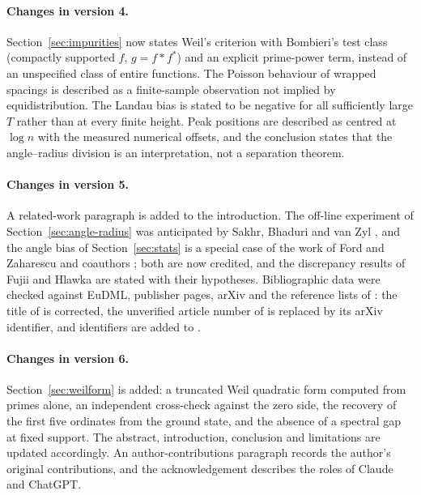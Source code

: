 \documentclass[11pt,a4paper]{article}
\theoremstyle{definition}\newtheorem{definition}[proposition]{Definition}
\theoremstyle{remark}\newtheorem{remark}[proposition]{Remark}
\begin{document}
\paragraph{Changes in version 4.} Section~\ref{sec:impurities} now states Weil's criterion with Bombieri's test class (compactly supported $f$, $g=f*f^*$) and an explicit prime-power term, instead of an unspecified class of entire functions. The Poisson behaviour of wrapped spacings is described as a finite-sample observation not implied by equidistribution. The Landau bias is stated to be negative for all sufficiently large $T$ rather than at every finite height. Peak positions are described as centred at $\log n$ with the measured numerical offsets, and the conclusion states that the angle--radius division is an interpretation, not a separation theorem.

\paragraph{Changes in version 5.} A related-work paragraph is added to the introduction. The off-line experiment of Section~\ref{sec:angle-radius} was anticipated by Sakhr, Bhaduri and van Zyl \cite{SakhrBhaduriVanZyl2003}, and the angle bias of Section~\ref{sec:stats} is a special case of the work of Ford and Zaharescu and coauthors \cite{FordZaharescu2005,FordSoundararajanZaharescu,FordMengZaharescu}; both are now credited, and the discrepancy results of Fujii and Hlawka are stated with their hypotheses. Bibliographic data were checked against EuDML, publisher pages, arXiv and the reference lists of \cite{FordSoundararajanZaharescu}: the title of \cite{Hlawka1975} is corrected, the unverified article number of \cite{ConnesConsani2021} is replaced by its arXiv identifier, and identifiers are added to \cite{Meyer2005,PlattTrudgian2021}.

\paragraph{Changes in version 6.} Section~\ref{sec:weilform} is added: a truncated Weil quadratic form computed from primes alone, an independent cross-check against the zero side, the recovery of the first five ordinates from the ground state, and the absence of a spectral gap at fixed support. The abstract, introduction, conclusion and limitations are updated accordingly. An author-contributions paragraph records the author's original contributions, and the acknowledgement describes the roles of Claude and ChatGPT.
\end{document}
